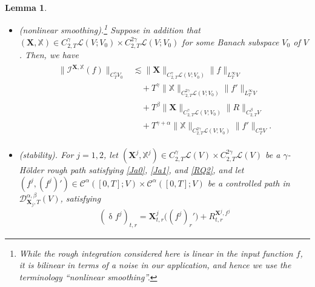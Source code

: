 \documentclass[letterpaper, 11pt,  reqno]{amsart}
\newtheorem{lemma}[theorem]{Lemma}
\newcommand{\1}{\hspace{0.5mm}\textup{I}\hspace{0.5mm}}
\newcommand{\I}{\mathcal{I}}
\newcommand{\noi}{\noindent}
\newcommand{\CC}{\mathcal{C}}
\newcommand{\D}{\mathcal{D}}
\renewcommand{\L}{\mathcal{L}}
\newcommand{\al}{\alpha}
\newcommand{\be}{\beta}
\newcommand{\updl}{\updelta}
\newcommand{\g}{\gamma}
\newcommand{\les}{\lesssim}
\newcommand{\XXb}{\mathbb{X}}
\newcommand{\XX}{\mathbf{X}}
\numberwithin{equation}{section}
\numberwithin{theorem}{section}
\begin{document}
\begin{lemma}
\begin{itemize}
\noi
Moreover,  \eqref{RQ7} holds.




\smallskip

\item[(iii)]
\textup{(nonlinear smoothing).}\footnote{While 
the  rough integration considered here is linear in 
the input function $f$, 
it is bilinear in terms of a noise in our application, 
and hence we use the terminology ``nonlinear smoothing''.}
Suppose in addition that 
 $(\XX, \XXb) 
\in C^\g_{2,T}\L(V; V_0)\times  C^{2\g}_{2,T}\L(V;V_0)$
for some Banach subspace $V_0$ of $V$.
Then, we have 
\begin{align}
\begin{split}
\|\I^{\XX, \XXb}(f)\|_{C^\g_T  V_0} 
& \les
\|\XX\|_{C^\g_{2,T}\L(V; V_0)}
\|f \|_{L^\infty_TV}\\
& \quad 
+  T^{\g}
\|\XXb\|_{C^{2\g}_{2,T}\L(V; V_0)}
\|f' \|_{L^\infty_TV}\\
& \quad 
+  T^{\be}
\|\XX\|_{C^\g_{2,T}\L(V; V_0)}
\| R\|_{C^\be_{2,T}V}\\
& \quad + 
 T^{\g+ \al}
\|\XXb\|_{C^{2\g}_{2,T}\L(V; V_0)}
\| f'\|_{C^\al_{T}V}.
\end{split}
\label{RQQ5}
\end{align}




\smallskip

\item[(iv)]
\textup{(stability).}
For $j = 1, 2$, 
let $(\XX^j, \XXb^j) 
\in C^\g_{2,T}\L(V)\times  C^{2\g}_{2,T}\L(V)$
be a $\g$-H\"older rough path  
satisfying \eqref{Ja0}, 
\eqref{Ja1}, and \eqref{RQ2}, 
and 
let $(f^j, (f^j)')\in  
\CC^{\al}([0,T];V)
\times 
\CC^{\al}([0,T];V)$
be a controlled  path
in 
$\D^{\al, \be}_{\XX_j, T}(V)$, 
satisfying
\begin{align*}
(\updl f^j)_{t, r} = \XX^j_{t, r} \big(  (f^j)_r'\big) + R^{\XX^j, f^j}_{t, r}
\end{align*}



\end{itemize}
\end{lemma}
\end{document}
